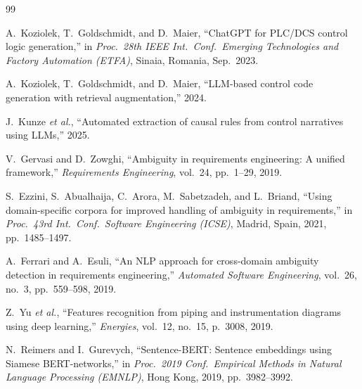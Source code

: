 \documentclass[journal]{IEEEtran}
\begin{document}


\begin{thebibliography}{99}

A.~Koziolek, T.~Goldschmidt, and D.~Maier,
``ChatGPT for PLC/DCS control logic generation,''
in \textit{Proc.\ 28th IEEE Int.\ Conf.\ Emerging Technologies and Factory
Automation (ETFA)}, Sinaia, Romania, Sep.\ 2023.

A.~Koziolek, T.~Goldschmidt, and D.~Maier,
``LLM-based control code generation with retrieval augmentation,''
2024.

J.~Kunze \textit{et al.},
``Automated extraction of causal rules from control narratives using LLMs,''
2025.

V.~Gervasi and D.~Zowghi,
``Ambiguity in requirements engineering: A unified framework,''
\textit{Requirements Engineering},
vol.~24, pp.~1--29, 2019.

S.~Ezzini, S.~Abualhaija, C.~Arora, M.~Sabetzadeh, and L.~Briand,
``Using domain-specific corpora for improved handling of ambiguity
in requirements,''
in \textit{Proc.\ 43rd Int.\ Conf.\ Software Engineering (ICSE)},
Madrid, Spain, 2021, pp.~1485--1497.

A.~Ferrari and A.~Esuli,
``An NLP approach for cross-domain ambiguity detection in requirements
engineering,''
\textit{Automated Software Engineering},
vol.~26, no.~3, pp.~559--598, 2019.

Z.~Yu \textit{et al.},
``Features recognition from piping and instrumentation diagrams using
deep learning,''
\textit{Energies},
vol.~12, no.~15, p.~3008, 2019.

N.~Reimers and I.~Gurevych,
``Sentence-BERT: Sentence embeddings using Siamese BERT-networks,''
in \textit{Proc.\ 2019 Conf.\ Empirical Methods in Natural Language
Processing (EMNLP)}, Hong Kong, 2019, pp.~3982--3992.


\end{thebibliography}
\end{document}
